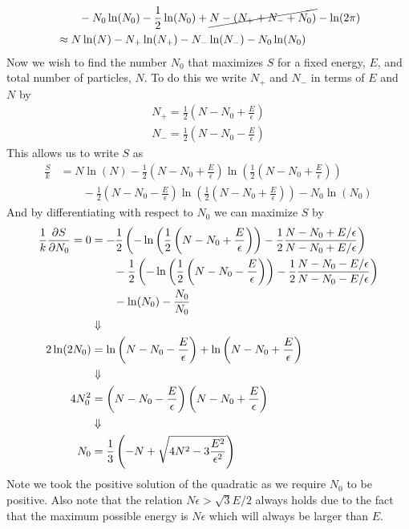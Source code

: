 \documentclass[11pt]{article}
\numberwithin{equation}{section}
\begin{document}
\begin{enumerate}[(1)]
\begin{align*}
&\qquad   - N_0\ln(N_0) - \frac{1}{2}\ln(N_0) + \cancel{N - (N_++N_-+N_0)} - \ln(2\pi) \\
&\approx N\ln(N) - N_+\ln(N_+) - N_-\ln(N_-) - N_0\ln(N_0) 
\end{align*}
Now we wish to find the number $N_0$ that maximizes $S$ for a fixed energy, $E$, and total
number of particles, $N$. To do this we write $N_+$ and $N_-$ in terms of $E$ and $N$ by
\begin{align*}
N_+ = \frac{1}{2}\left(N-N_0+\frac{E}{\epsilon}\right)\\
N_- = \frac{1}{2}\left(N-N_0-\frac{E}{\epsilon}\right)
\end{align*}
This allows us to write $S$ as
\begin{align*}
\frac{S}{k} &= N\ln(N) - \frac{1}{2}\left(N-N_0+\frac{E}{\epsilon}\right)\ln\left(\frac{1}{2}\left(N-N_0+\frac{E}{\epsilon}\right)\right)\\
&\qquad - \frac{1}{2}\left(N-N_0-\frac{E}{\epsilon}\right)\ln\left(\frac{1}{2}\left(N-N_0+\frac{E}{\epsilon}\right)\right) - N_0\ln(N_0) 
\end{align*}
And by differentiating with respect to $N_0$ we can maximize $S$ by
\begin{align*}
\frac{1}{k}\frac{\partial{S}}{\partial{N_0}} = 0 &= -\frac{1}{2}\left(-\ln\left(\frac{1}{2}\left(N-N_0+\frac{E}{\epsilon}\right)\right) -\frac{1}{2}\frac{N-N_0+E/\epsilon}{N-N_0+E/\epsilon}\right)\\
&\qquad -\frac{1}{2}\left(-\ln\left(\frac{1}{2}\left(N-N_0-\frac{E}{\epsilon}\right)\right) -\frac{1}{2}\frac{N-N_0-E/\epsilon}{N-N_0-E/\epsilon}\right)\\
&\qquad - \ln(N_0) - \frac{N_0}{N_0}\\
&\Downarrow\\
2\ln(2N_0) &= \ln\left(N-N_0-\frac{E}{\epsilon}\right) + \ln\left(N-N_0+\frac{E}{\epsilon}\right)\\
&\Downarrow\\
4N_0^2 &= \left(N-N_0-\frac{E}{\epsilon}\right)\left(N-N_0+\frac{E}{\epsilon}\right)\\
&\Downarrow\\
N_0 &= \frac{1}{3}\left(-N+\sqrt{4N^2-3\frac{E^2}{\epsilon^2}}\right)
\end{align*}
Note we took the positive solution of the quadratic as we require $N_0$ to be positive. Also
note that the relation $N\epsilon>\sqrt{3}E/2$ always holds due to the fact that the maximum 
possible energy is $N\epsilon$ which will always be larger than $E$.


\end{enumerate}
\end{document}
